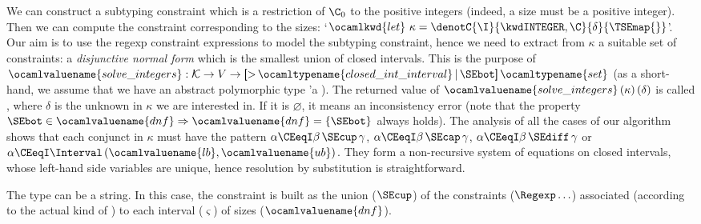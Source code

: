 We can construct a subtyping constraint \C{} which is a restriction of
$\C_0$ to the positive integers (indeed, a size must be a positive
integer). Then we can compute the constraint corresponding to the
sizes: `$\ocamlkwd{let} \,\, \kappa = \denotC{\I}{\kwdINTEGER,
  \C}{\delta}{\TSEmap{}}$'. Our aim is to use the regexp constraint
expressions to model the \kwdSIZE{} subtyping constraint, hence we
need to extract from $\kappa$ a suitable set of constraints: a
\emph{disjunctive normal form} which is the smallest union of closed
intervals. This is the purpose of $\ocamlvaluename{solve\_integers} :
{\cal K} \rightarrow V \rightarrow \textsf{[$>$} \,
  \ocamltypename{clo\-sed\_int\_in\-ter\-val} \, \textsf{$\mid$} \,
  \SEbot\textsf{]} \, \ocamltypename{set}$ (as a short-hand, we assume
that we have an abstract polymorphic type \textsf{'a}
). The returned value of
$\ocamlvaluename{solve\_integers} \, (\kappa) \, (\delta)$ is called
, where $\delta$ is the unknown in $\kappa$ we are
interested in. If it is $\varnothing$, it means an inconsistency error
(note that the property $\SEbot \in \ocamlvaluename{dnf} \Rightarrow
\ocamlvaluename{dnf} = \{\SEbot\}$ always holds). The analysis of all
the cases of our algorithm shows that each conjunct in $\kappa$ must
have the pattern $\alpha \CEeqI \beta \, \SEcup \, \gamma$, $\alpha
\CEeqI \beta \, \SEcap \, \gamma$, $\alpha \CEeqI \beta \, \SEdiff \,
\gamma$ or $\alpha \CEeqI \Interval \, (\ocamlvaluename{lb},
\ocamlvaluename{ub})$. They form a non-recursive system of equations
on closed intervals, whose left-hand side variables are unique, hence
resolution by substitution is straightforward.

The type \T{} can be a string. In this case, the constraint is built
as the union ($\SEcup$) of the constraints ($\Regexp \ldots$)
associated (according to the actual kind of \T) to each interval
($\varsigma$) of sizes ($\ocamlvaluename{dnf}$).

